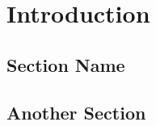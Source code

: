\chapter{Introduction}
\label{chap:intro}

\section{Section Name} \label{sec:s1}


\section{Another Section}

